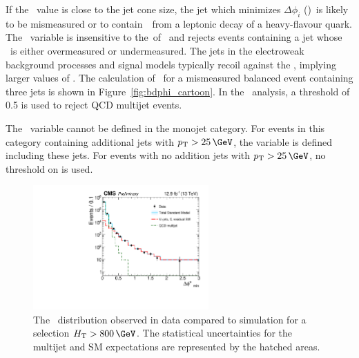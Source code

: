 If the \bdphi~value is close to the jet cone size, the jet which minimizes $\Delta \phi_i$ (\jbdphi)~is likely 
to be mismeasured or to contain~\met~from a leptonic decay of a heavy-flavour quark. The \bdphi~variable is insensitive to
the~\pt of \jbdphi~and rejects events containing a jet whose \pt~is either overmeasured or undermeasured.
The jets in the electroweak background processes and signal models typically recoil against the
\met, implying larger values of \bdphi. The calculation of \bdphi~for a mismeasured balanced 
event containing three jets is shown in Figure~\ref{fig:bdphi_cartoon}. 
In the \alphat~analysis, a threshold of 0.5 is used to reject QCD multijet events.

The \bdphi~variable cannot be defined in the monojet category. For events in this category
containing additional jets with $\pt > 25\,\GeV$, the \bdphi variable is defined 
including these jets. For events with no addition jets with $\pt > 25\,\GeV$,
no threshold on \bdphi is used.


\begin{figure}[!htb]
  \centering
    \includegraphics[width=0.6\textwidth]{./Figures/alphat/bdphi_data.pdf}
  \caption{
    The \bdphi~distribution observed in data compared to simulation for a selection $\scalht > 800\,\GeV$.
    The statistical uncertainties for the multijet and SM expectations are represented by the hatched areas. 
    }
  \label{fig:bdphi-data}
\end{figure}

